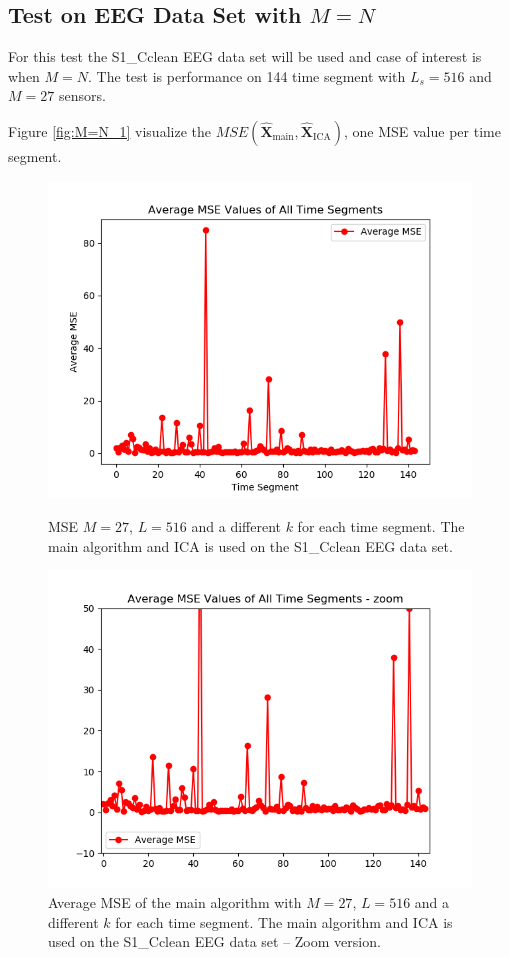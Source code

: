 \subsection{Test on EEG Data Set with $M=N$}
For this test the S1\_Cclean EEG data set will be used and case of interest is when $M = N$. The test is performance on 144 time segment with $L_s = 516$ and $M = 27$ sensors.

Figure \ref{fig:M=N_1} visualize the $MSE\left(\hat{\mathbf{X}}_{\text{main}},\hat{\mathbf{X}}_{\text{ICA}}\right)$, one MSE value per time segment.
\begin{figure}[H]
    \begin{minipage}[t]{.45\textwidth}
		\centering
		\includegraphics[scale=0.5]{figures/ch_7/AveMSE_M=N.png}
	\caption{MSE $M=27$, $L = 516$ and a different $k$ for each time segment. The main algorithm and ICA is used on the S1\_Cclean EEG data set.}
	\label{fig:M=N_1}
    \end{minipage} 
    \hfill
    \begin{minipage}[t]{.45\textwidth}
        \centering
		\includegraphics[scale=0.5]{figures/ch_7/AveMSE_M=N_zoom.png}
	\caption{Average MSE of the main algorithm with $M=27$, $L = 516$ and a different $k$ for each time segment. The main algorithm and ICA is used on the S1\_Cclean EEG data set -- Zoom version.}
	\label{fig:M=N_1_2}
    \end{minipage}
\end{figure}
